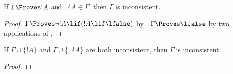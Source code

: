 \documentclass[../../../include/open-logic-section]{subfiles}
\begin{document}
\begin{prop}
  If $\Gamma \Proves !A$ and $\lnot !A \in \Gamma$, then $\Gamma$ is
  inconsistent.
\end{prop}

\begin{proof}
  $\Gamma \Proves \lnot !A \lif (!A \lif \lfalse)$ by .
  $\Gamma \Proves \lfalse$ by two applications of .
\end{proof}


\begin{prop}
  If $\Gamma \cup \{!A\}$ and $\Gamma \cup \{\lnot !A\}$ are both
  inconsistent, then $\Gamma$ is inconsistent.
\end{prop}

\begin{proof}

\end{proof}
\end{document}
